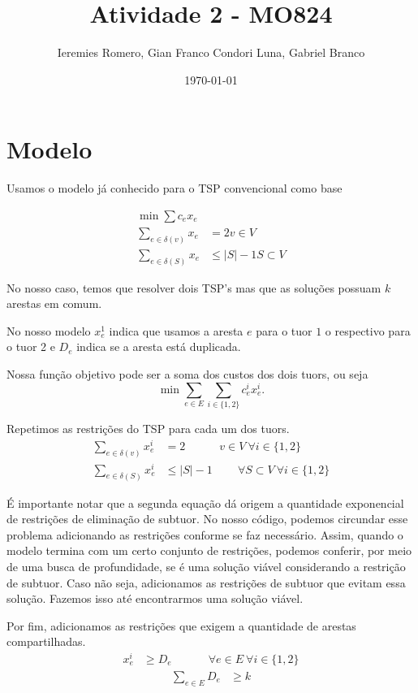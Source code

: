 \documentclass[11pt]{article}
\author{Ieremies Romero, Gian Franco Condori Luna, Gabriel Branco}
\date{\today}
\title{Atividade 2 - MO824}
\theoremstyle{definition}
\theoremstyle{definition}
\theoremstyle{remark}
\theoremstyle{remark}
\theoremstyle{remark}
\theoremstyle{remark}
\theoremstyle{definition}
\begin{document}
\maketitle


\section*{Modelo}
\label{sec:org5ad2af7}

Usamos o modelo já conhecido para o TSP convencional como base

\begin{align*}
\min \sum c_{e} x_{e}& \\
\sum \limits_{e \in \delta(v)} x_{e} &= 2 v \in V \\
\sum \limits_{e \in \delta(S)} x_{e} &\leq |S| -1 S \subset V
\end{align*}

No nosso caso, temos que resolver dois TSP's mas que as soluções possuam \(k\) arestas em comum.

No nosso modelo \(x_{e}^{1}\) indica que usamos a aresta \(e\) para o tuor \(1\) o respectivo para o tuor 2 e \(D_{e}\) indica se a aresta está duplicada.

Nossa função objetivo pode ser a soma dos custos dos dois tuors, ou seja
\[  \min \sum \limits_{e \in E} \sum \limits_{i \in \{1,2\}} c_{e}^{i} x_{e}^{i}. \]

Repetimos as restrições do TSP para cada um dos tuors.
\begin{align*}
\sum \limits_{e \in \delta(v)} x_{e}^{i} &= 2 \hspace{3em} v \in V \ \forall i \in \{1,2\} \\
\sum \limits_{e \in \delta(S)} x_{e}^{i} &\leq |S| -1 \hspace{2em}\ \forall S \subset V \ \forall i \in \{1,2\}
\end{align*}

É importante notar que a segunda equação dá origem a quantidade exponencial de restrições de eliminação de subtuor. No nosso código, podemos circundar esse problema adicionando as restrições conforme se faz necessário. Assim, quando o modelo termina com um certo conjunto de restrições, podemos conferir, por meio de uma busca de profundidade, se é uma solução viável considerando a restrição de subtuor. Caso não seja, adicionamos as restrições de subtuor que evitam essa solução. Fazemos isso até encontrarmos uma solução viável.

Por fim, adicionamos as restrições que exigem a quantidade de arestas compartilhadas.
\begin{align*}
x_{e}^{i} &\geq D_{e} \hspace{3em}\ \forall e \in E \ \forall i \in \{1,2\}
\end{align*}
\begin{align*}
\sum \limits_{e \in E} D_{e} &\geq k
\end{align*}
\end{document}
